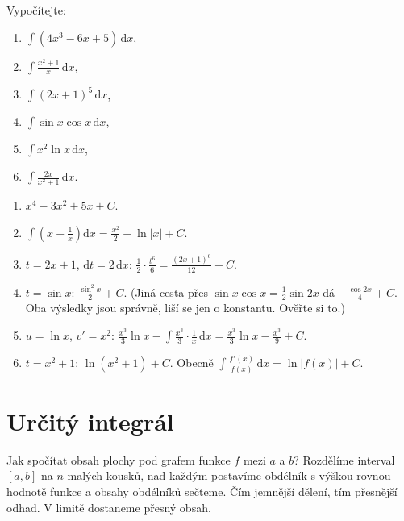 \begin{problem}
  Vypočítejte:
  \begin{enumerate}[label=(\alph*)]
    \item $\int(4x^3 - 6x + 5)\,\mathrm{d}x$,
    \item $\int\frac{x^2 + 1}{x}\,\mathrm{d}x$,
    \item $\int{(2x + 1)}^{5}\,\mathrm{d}x$,
    \item $\int\sin x\cos x\,\mathrm{d}x$,
    \item $\int x^2\ln x\,\mathrm{d}x$,
    \item $\int\frac{2x}{x^2 + 1}\,\mathrm{d}x$.
  \end{enumerate}
\end{problem}

\begin{solution}
  \begin{enumerate}[label=(\alph*)]
    \item $x^4 - 3x^2 + 5x + C$.
    \item $\int\left(x + \frac{1}{x}\right)\mathrm{d}x = \frac{x^2}{2} + \ln|x| + C$.
    \item $t = 2x + 1$, $\mathrm{d}t = 2\,\mathrm{d}x$: $\frac{1}{2}\cdot\frac{t^6}{6} = \frac{{(2x + 1)}^6}{12} + C$.
    \item $t = \sin x$: $\frac{\sin^2 x}{2} + C$. (Jiná cesta přes $\sin x\cos x = \frac{1}{2}\sin 2x$ dá $-\frac{\cos 2x}{4} + C$. Oba výsledky jsou správně, liší se jen o konstantu. Ověřte si to.)
    \item $u = \ln x$, $v' = x^2$: $\frac{x^3}{3}\ln x - \int\frac{x^3}{3}\cdot\frac{1}{x}\,\mathrm{d}x = \frac{x^3}{3}\ln x - \frac{x^3}{9} + C$.
    \item $t = x^2 + 1$: $\ln(x^2 + 1) + C$. Obecně $\int\frac{f'(x)}{f(x)}\,\mathrm{d}x = \ln|f(x)| + C$.
  \end{enumerate}
\end{solution}

\section{Určitý integrál}\label{sec:urcity-integral}

Jak spočítat obsah plochy pod grafem funkce $f$ mezi $a$ a $b$? Rozdělíme interval $[a, b]$ na $n$ malých kousků, nad každým postavíme obdélník s výškou rovnou hodnotě funkce a obsahy obdélníků sečteme. Čím jemnější dělení, tím přesnější odhad. V limitě dostaneme přesný obsah.

